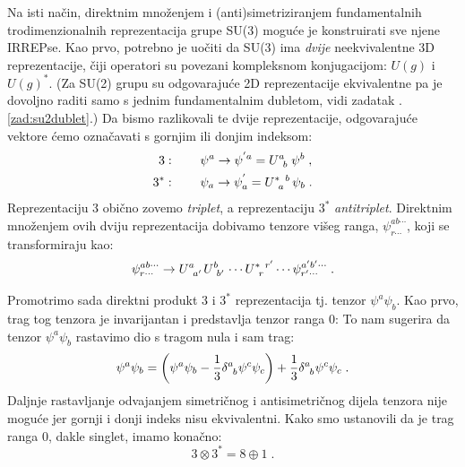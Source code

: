 Na isti način, direktnim množenjem i (anti)simetriziranjem
fundamentalnih trodimenzionalnih reprezentacija grupe SU(3) moguće
je konstruirati sve njene IRREPse. Kao prvo, potrebno je uočiti da
SU(3) ima \emph{dvije} neekvivalentne 3D reprezentacije,
čiji operatori su povezani kompleksnom konjugacijom: $U(g)$ i
$U(g)^*$. (Za SU(2) grupu su odgovarajuće 2D reprezentacije ekvivalentne
pa je dovoljno raditi samo s jednim fundamentalnim dubletom, vidi
zadatak \thechapter.\ref{zad:su2dublet}.)
Da bismo razlikovali te dvije reprezentacije, odgovarajuće vektore
ćemo označavati s gornjim ili donjim indeksom:
\begin{align}
 3&: \qquad  \psi^a \to \psi^{'a} = \tensor{U}{^a_b} \, \psi^{b} \;, \\
 3^*&: \qquad  \psi_a \to \psi^{'}_a = \tensor{U}{^*_a^b} \, \psi_{b} \;.
\label{eq:su3fundamental}
\end{align}
Reprezentaciju 3 obično zovemo \emph{triplet}, a
reprezentaciju $3^*$ \emph{antitriplet}.
Direktnim množenjem ovih dviju  reprezentacija dobivamo 
tenzore višeg ranga, $\psi^{ab\cdots}_{r\cdots}$, koji
se transformiraju kao:
\begin{equation}
  \psi^{ab\cdots}_{r\cdots} \to 
 \tensor{U}{^{a}_{a'}} \tensor{U}{^{b}_{b'}} \cdots \tensor{U}{^*_r^{r'}} \cdots
  \psi^{a'b'\cdots}_{r'\cdots} \;.
\label{eq:mntensor}
\end{equation}

Promotrimo sada direktni produkt 3 i $3^*$ reprezentacija tj.
tenzor $\psi^a \psi_b$.
Kao prvo, trag tog tenzora je invarijantan i predstavlja tenzor 
ranga 0:
To nam sugerira da tenzor $\psi^a \psi_b$ rastavimo 
 dio s tragom nula i sam trag:
\begin{equation}
\psi^a \psi_b = \left(\psi^a \psi_b - \frac{1}{3}
\tensor{\delta}{^a_b}\psi^c \psi_c \right) +
\frac{1}{3} \tensor{\delta}{^a_b} \psi^c \psi_c  \;.
\label{eq:rastav3c3tensor}
\end{equation}
Daljnje rastavljanje odvajanjem simetričnog i antisimetričnog
dijela tenzora nije moguće jer gornji i donji indeks
nisu ekvivalentni. Kako smo ustanovili da je trag ranga 0,
dakle singlet, imamo konačno:
\begin{equation}
  3 \otimes 3^* = 8 \oplus 1 \;.
\label{eq:rastav3c3}
\end{equation}

